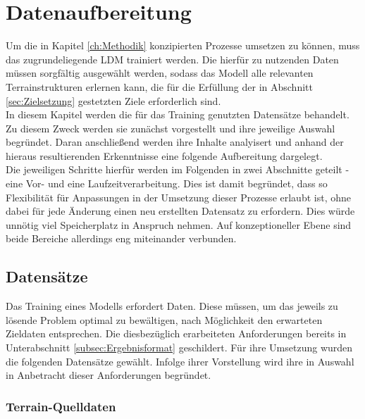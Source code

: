 \chapter{Datenaufbereitung}
\label{ch:Datenaufbereitung}

Um die in Kapitel \ref{ch:Methodik} konzipierten Prozesse umsetzen zu können, muss das zugrundeliegende \ac{LDM} trainiert werden. Die hierfür zu nutzenden Daten müssen sorgfältig ausgewählt werden, sodass das Modell alle relevanten Terrainstrukturen erlernen kann, die für die Erfüllung der in Abschnitt \ref{sec:Zielsetzung} gestetzten Ziele erforderlich sind. \\
In diesem Kapitel werden die für das Training genutzten Datensätze behandelt. Zu diesem Zweck werden sie zunächst vorgestellt und ihre jeweilige Auswahl begründet. Daran anschließend werden ihre Inhalte analyisert und anhand der hieraus resultierenden Erkenntnisse eine folgende Aufbereitung dargelegt. \\
Die jeweiligen Schritte hierfür werden im Folgenden in zwei Abschnitte geteilt - eine Vor- und eine Laufzeitverarbeitung. Dies ist damit begründet, dass so Flexibilität für Anpassungen in der Umsetzung dieser Prozesse erlaubt ist, ohne dabei für jede Änderung einen neu erstellten Datensatz zu erfordern. Dies würde unnötig viel Speicherplatz in Anspruch nehmen. Auf konzeptioneller Ebene sind beide Bereiche allerdings eng miteinander verbunden.

\section{Datensätze}

Das Training eines Modells erfordert Daten. Diese müssen, um das jeweils zu lösende Problem optimal zu bewältigen, nach Möglichkeit den erwarteten Zieldaten entsprechen. Die diesbezüglich erarbeiteten Anforderungen bereits in Unterabschnitt \ref{subsec:Ergebnisformat} geschildert. Für ihre Umsetzung wurden die folgenden Datensätze gewählt. Infolge ihrer Vorstellung wird ihre in Auswahl in Anbetracht dieser Anforderungen begründet.

\subsection{Terrain-Quelldaten}

